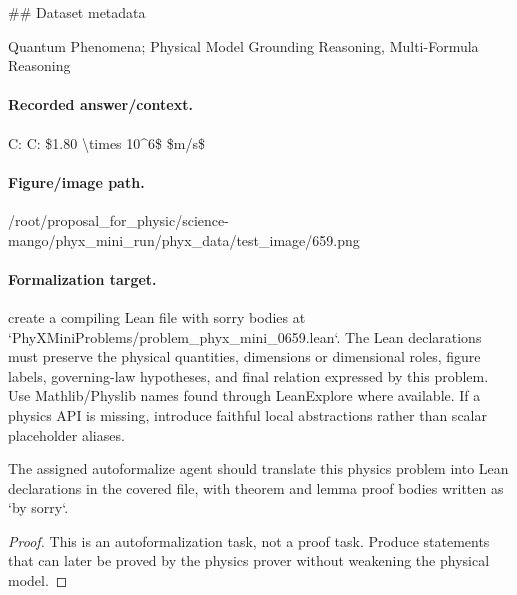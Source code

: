 \#\# Dataset metadata

Quantum Phenomena; Physical Model Grounding Reasoning, Multi-Formula Reasoning

\paragraph{Recorded answer/context.}
C: C: \$1.80 \textbackslash{}times 10\textasciicircum{}6\$ \$m/s\$

\paragraph{Figure/image path.}
/root/proposal\_for\_physic/science-mango/phyx\_mini\_run/phyx\_data/test\_image/659.png

\paragraph{Formalization target.}
create a compiling Lean file with sorry bodies at `PhyXMiniProblems/problem\_phyx\_mini\_0659.lean`. The Lean declarations must preserve the physical quantities, dimensions or dimensional roles, figure labels, governing-law hypotheses, and final relation expressed by this problem.
Use Mathlib/Physlib names found through LeanExplore where available. If a physics API is missing, introduce faithful local abstractions rather than scalar placeholder aliases.

\begin{theorem}
\label{thm:physics:phyx_mini_0659:target}
The assigned autoformalize agent should translate this physics problem into Lean declarations in the covered file, with theorem and lemma proof bodies written as `by sorry`.
\end{theorem}
\begin{proof}
This is an autoformalization task, not a proof task. Produce statements that can later be proved by the physics prover without weakening the physical model.
\end{proof}

